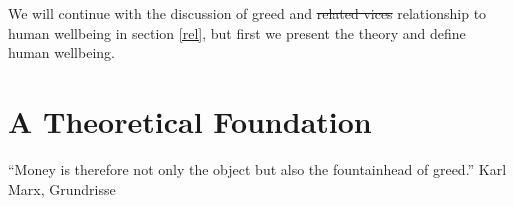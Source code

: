 \documentclass[10pt, letterpaper]{article}
\providecommand{\DIFaddtex}[1]{{\protect\color{blue}\uwave{#1}}} %
\providecommand{\DIFdeltex}[1]{{\protect\color{red}\sout{#1}}}                      %
\providecommand{\DIFaddbegin}{} %
\providecommand{\DIFaddend}{} %
\providecommand{\DIFdelbegin}{} %
\providecommand{\DIFdelend}{} %
\providecommand{\DIFadd}[1]{\texorpdfstring{\DIFaddtex{#1}}{#1}} %
\providecommand{\DIFdel}[1]{\texorpdfstring{\DIFdeltex{#1}}{}} %
\newcommand{\DIFscaledelfig}{0.5}
\newlength{\DIFdelgraphicswidth} %
\newlength{\DIFdelgraphicsheight} %
\newcommand{\DIFaddincludegraphics}[2][]{{\color{blue}\fbox{\DIFOincludegraphics[#1]{#2}}}} %
\newcommand{\DIFdelincludegraphics}[2][]{%
\sbox{\DIFdelgraphicsbox}{\DIFOincludegraphics[#1]{#2}}%
\settoboxwidth{\DIFdelgraphicswidth}{\DIFdelgraphicsbox} %
\settoboxtotalheight{\DIFdelgraphicsheight}{\DIFdelgraphicsbox} %
\scalebox{\DIFscaledelfig}{%
\parbox[b]{\DIFdelgraphicswidth}{\usebox{\DIFdelgraphicsbox}\\[-\baselineskip] \rule{\DIFdelgraphicswidth}{0em}}\llap{\resizebox{\DIFdelgraphicswidth}{\DIFdelgraphicsheight}{%
\setlength{\unitlength}{\DIFdelgraphicswidth}%
\begin{picture}(1,1)%
\thicklines\linethickness{2pt} %
{\color[rgb]{1,0,0}\put(0,0){\framebox(1,1){}}}%
{\color[rgb]{1,0,0}\put(0,0){\line( 1,1){1}}}%
{\color[rgb]{1,0,0}\put(0,1){\line(1,-1){1}}}%
\end{picture}%
}\hspace*{3pt}}} %
} %
\DeclareRobustCommand{\DIFaddbegin}{\DIFOaddbegin \let\includegraphics\DIFaddincludegraphics} %
\DeclareRobustCommand{\DIFaddend}{\DIFOaddend \let\includegraphics\DIFOincludegraphics} %
\DeclareRobustCommand{\DIFdelbegin}{\DIFOdelbegin \let\includegraphics\DIFdelincludegraphics} %
\DeclareRobustCommand{\DIFdelend}{\DIFOaddend \let\includegraphics\DIFOincludegraphics} %
\begin{document}
\begin{spacing}{1.8}
We will continue with the discussion of greed and \DIFdelbegin \DIFdel{related vices }\DIFdelend \DIFaddbegin \DIFadd{its }\DIFaddend relationship to
human wellbeing in section \ref{rel}, but first we present the theory and define
human wellbeing.

\section{A Theoretical Foundation}

\noindent``Money is therefore not only the object but also the fountainhead of greed.'' Karl Marx, Grundrisse\\



%


\end{spacing}
\end{document}
